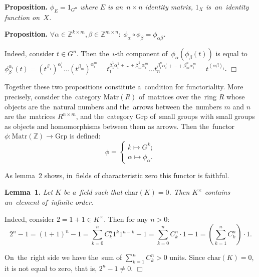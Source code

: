 \documentclass[twoside]{article}
\begin{document}
\medskip\noindent\textbf{Proposition.}\emph{
    $\phi_{E} = 1_{G^n}$ where $E$ is an~$n \times n$ identity matrix, $1_X$ is~an~identity function on~$X$.
}

\medskip\noindent\textbf{Proposition.}\emph{
    $
        \forall \alpha \in \mathbb{Z}^{k \times m}, \beta \in \mathbb{Z}^{m \times n}{:}\ \phi_\alpha \circ \phi_\beta = \phi_{\alpha \beta}
    $.
}\medskip

    Indeed, consider $t \in G^n$. Then the~$i$-th component of~$\phi_\alpha(\phi_\beta(t))$
    is equal to $\phi_\beta^{\alpha_i}(t) = (t^{\beta_1})^{\alpha_i^1} \ldots (t^{\beta_m})^{\alpha_i^m}
                                          = t_1^{\beta_1^1 \alpha_i^1 + \ldots + \beta_m^1 \alpha_i^m}
                                            \ldots
                                            t_n^{\beta_1^n \alpha_i^1 + \ldots + \beta_m^n \alpha_i^m}
                                          = t^{(\alpha \beta)_i}$.
\hfill$\Box$\medskip

Together these two propositions constitute a~condition for functoriality. More precisely, consider the~category $\mathrm{Matr}(R)$ of~matrices over the~ring $R$
whose objects are the~natural numbers and the~arrows between the~numbers $m$ and $n$ are the~matrices $R^{n \times m}$,
and the~category $\mathrm{Grp}$ of~small groups with small groups as objects and homomorphisms between them as arrows.
Then the~functor $\phi : \mathrm{Matr}(\mathbb{Z}) \rightarrow \mathrm{Grp}$ is defined:
$$
    \phi = \begin{cases}
        k \mapsto G^k; \\
        \alpha \mapsto \phi_\alpha.
    \end{cases}
$$

As lemma~2 shows, in~fields of characteristic zero this functor is faithful.

\medskip\noindent\textbf{Lemma~1.}\emph{
    Let $K$ be a~field such that $\mathrm{char}(K) = 0$.
    Then $K^\times$ contains an~element of~infinite order.
}\medskip

    Indeed, consider $2 = 1 + 1 \in K^\times$. Then for any $n > 0$:
    $$
        2^n - 1 = (1 + 1)^n - 1 = \sum_{k = 0}^n C^n_k 1^k 1^{n - k} - 1
                                = \sum_{k = 0}^n C^n_k \cdot 1 - 1
                                = \left(\sum_{k = 1}^n C^n_k \right) \cdot 1.
    $$

    On~the~right side we have the~sum of $\sum_{k = 1}^n C^n_k > 0$ units. Since $\mathrm{char}(K) = 0$,
    it is not equal to zero, that is, $2^n - 1 \neq 0$.
\hfill$\Box$\medskip
\end{document}

